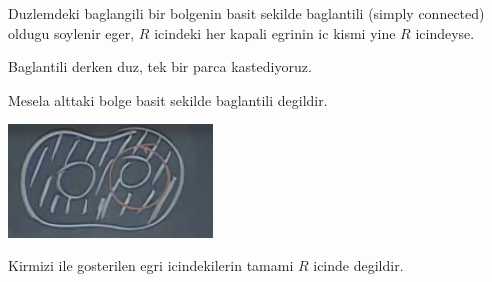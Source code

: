 \documentclass[12pt,fleqn]{article}
\begin{document}
Duzlemdeki baglangili bir bolgenin basit sekilde baglantili (simply
connected) oldugu soylenir eger, $R$ icindeki her kapali egrinin ic kismi
yine $R$ icindeyse. 

Baglantili derken duz, tek bir parca kastediyoruz.

Mesela alttaki bolge basit sekilde baglantili degildir. 

\includegraphics[height=3cm]{24_7.png}

Kirmizi ile gosterilen egri icindekilerin tamami $R$ icinde degildir. 
\end{document}
